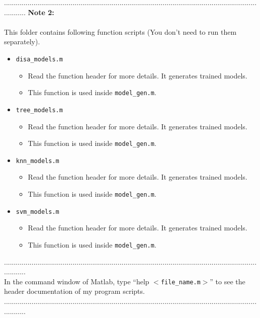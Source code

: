 \documentclass[a4paper,12pt]{article} %
\begin{document}
............................................................................................................................................
\textbf{Note 2: }\\\\
This folder contains following function scripts (You don't need to run them separately).
\begin{itemize}
		\item \verb|disa_models.m|
		\begin{itemize}
			\item Read the function header for more details. It generates trained models.
			\item This function is used inside \verb|model_gen.m|.
		\end{itemize}
		\item \verb|tree_models.m|
		\begin{itemize}
			\item Read the function header for more details. It generates trained models.
			\item This function is used inside \verb|model_gen.m|.
		\end{itemize}
		\item \verb|knn_models.m|
		\begin{itemize}
			\item Read the function header for more details. It generates trained models.
			\item This function is used inside \verb|model_gen.m|.
		\end{itemize}
		\item \verb|svm_models.m|
		\begin{itemize}
			\item Read the function header for more details. It generates trained models.
			\item This function is used inside \verb|model_gen.m|.
		\end{itemize}

\end{itemize}
............................................................................................................................................\\
In the command window of Matlab, type ``help $<$\verb|file_name.m|$>$'' to see the header documentation of my program scripts.\\
............................................................................................................................................
\end{document}
